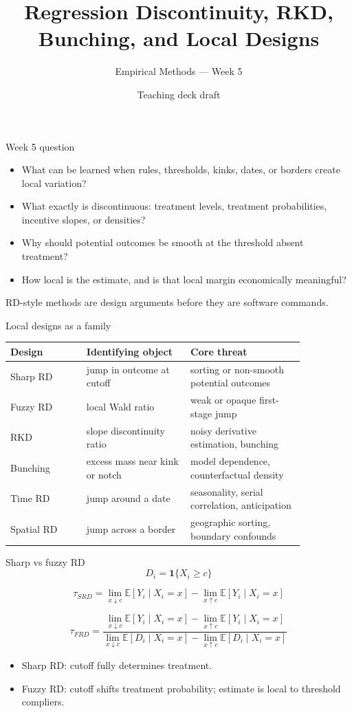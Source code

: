 \documentclass[aspectratio=169,11pt]{beamer}
\title{Regression Discontinuity, RKD, Bunching, and Local Designs}
\subtitle{Empirical Methods --- Week 5}
\author{Teaching deck draft}
\date{}
\newcommand{\E}{\mathbb{E}}
\newcommand{\1}{\mathbf{1}}
\begin{document}
\begin{frame}
  \titlepage
\end{frame}

\begin{frame}{Week 5 question}
\begin{itemize}
    \item What can be learned when rules, thresholds, kinks, dates, or borders create local variation?
    \item What exactly is discontinuous: treatment levels, treatment probabilities, incentive slopes, or densities?
    \item Why should potential outcomes be smooth at the threshold absent treatment?
    \item How local is the estimate, and is that local margin economically meaningful?
\end{itemize}

\medskip
RD-style methods are design arguments before they are software commands.
\end{frame}

\begin{frame}{Local designs as a family}
\small
\begin{tabular}{p{0.22\linewidth} p{0.30\linewidth} p{0.33\linewidth}}
\toprule
Design & Identifying object & Core threat \\
\midrule
Sharp RD & jump in outcome at cutoff & sorting or non-smooth potential outcomes \\
Fuzzy RD & local Wald ratio & weak or opaque first-stage jump \\
RKD & slope discontinuity ratio & noisy derivative estimation, bunching \\
Bunching & excess mass near kink or notch & model dependence, counterfactual density \\
Time RD & jump around a date & seasonality, serial correlation, anticipation \\
Spatial RD & jump across a border & geographic sorting, boundary confounds \\
\bottomrule
\end{tabular}
\end{frame}

\begin{frame}{Sharp vs fuzzy RD}
\[
D_i=\1\{X_i\ge c\}
\]

\[
\tau_{SRD}
=
\lim_{x\downarrow c}\E[Y_i\mid X_i=x]
-
\lim_{x\uparrow c}\E[Y_i\mid X_i=x]
\]

\[
\tau_{FRD}
=
\frac{
\lim_{x\downarrow c}\E[Y_i\mid X_i=x]
-
\lim_{x\uparrow c}\E[Y_i\mid X_i=x]
}{
\lim_{x\downarrow c}\E[D_i\mid X_i=x]
-
\lim_{x\uparrow c}\E[D_i\mid X_i=x]
}
\]

\begin{itemize}
    \item Sharp RD: cutoff fully determines treatment.
    \item Fuzzy RD: cutoff shifts treatment probability; estimate is local to threshold compliers.
\end{itemize}
\end{frame}
\end{document}
